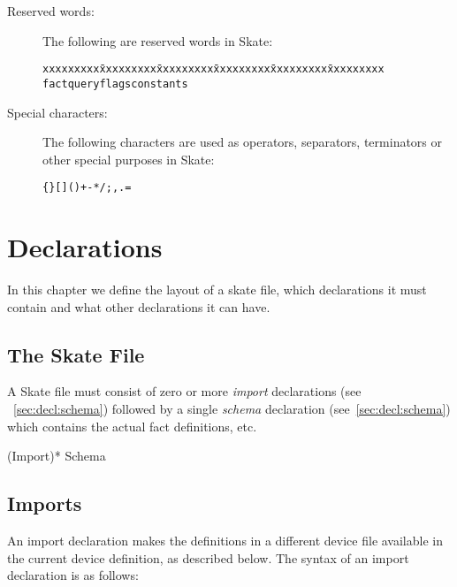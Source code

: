 \documentclass[a4paper,11pt,twoside]{report}
\begin{document}
{{\begin{description}
\item[Reserved words:] The following are reserved words in Skate:
\begin{alltt}
  \begin{tabbing}
xxxxxxxxx \= xxxxxxxxx \= xxxxxxxxx \= xxxxxxxxx \= xxxxxxxxx \= xxxxxxxxx \kill
fact \> query \> flags \> constants \>  \>  \\
  \end{tabbing}
\end{alltt}

\item[Special characters:] The following characters are used as operators,
  separators, terminators or other special purposes in Skate:
\begin{alltt}

  \{ \} [ ] ( ) + - * / ; , . = 

\end{alltt}

\end{description}



\chapter{Declarations}
\label{chap:declaration}

In this chapter we define the layout of a skate file, which declarations it
must contain and what other declarations it can have.

\section{The Skate File}
A Skate file must consist of zero or more \emph{import} declarations (see
~\ref{sec:decl:schema}) followed by a single \emph{schema} declaration 
(see~\ref{sec:decl:schema}) which contains the actual fact definitions, etc.

\begin{syntax}
(Import)*
Schema
\end{syntax}


\section{Imports}\label{sec:decl:import}
An import declaration makes the definitions in a different device file
available in the current device definition, as described below.  The
syntax of an import declaration is as follows:

}}
\end{document}

